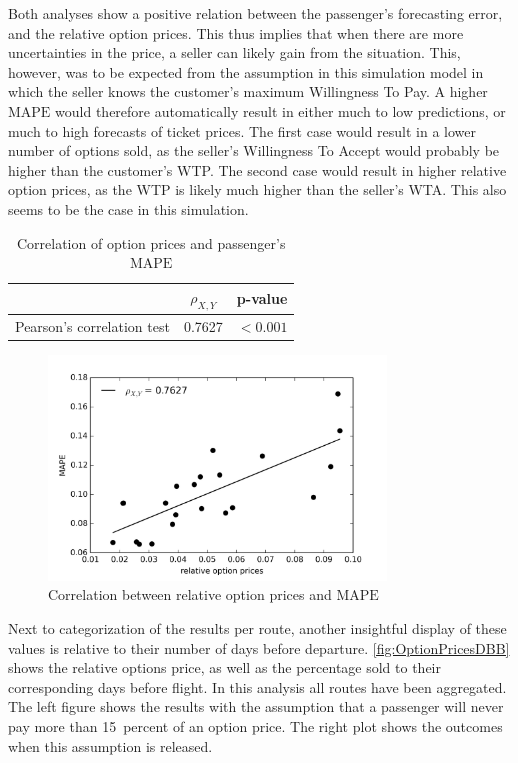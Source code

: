 Both analyses show a positive relation between the passenger's forecasting error, and the relative option prices. This thus implies that when there are more uncertainties in the price, a seller can likely gain from the situation. This, however, was to be expected from the assumption in this simulation model in which the seller knows the customer's maximum Willingness To Pay. A higher $\mbox{MAPE}$ would therefore automatically result in either much to low predictions, or much to high forecasts of ticket prices. The first case would result in a lower number of options sold, as the seller's Willingness To Accept would probably be higher than the customer's WTP. The second case would result in higher relative option prices, as the WTP is likely much higher than the seller's WTA. This also seems to be the case in this simulation.



\begin{table}
\centering
\begin{tabular}{l c c}
\toprule
~  &  $\rho_{X,Y}$  &  p-value   \\
\midrule
Pearson's correlation test &  0.7627  &  $< 0.001$ \\
\bottomrule
\end{tabular}
\caption{Correlation of option prices and passenger's $\mbox{MAPE}$}
\label{tbl:pearsonPricesMAPE}
\end{table}


\begin{figure}
    \centering
    \includegraphics[width=0.8\textwidth]{figures/correlation_optionPrices-MAPE}
    \caption{Correlation between relative option prices and $\mbox{MAPE}$}
    \label{fig:optionPricesMAPE}
\end{figure}


Next to categorization of the results per route, another insightful display of these values is relative to their number of days before departure. \autoref{fig:OptionPricesDBB} shows the relative options price, as well as the percentage sold to their corresponding days before flight. In this analysis all routes have been aggregated. The left figure shows the results with the assumption that a passenger will never pay more than 15~percent of an option price. The right plot shows the outcomes when this assumption is released.

